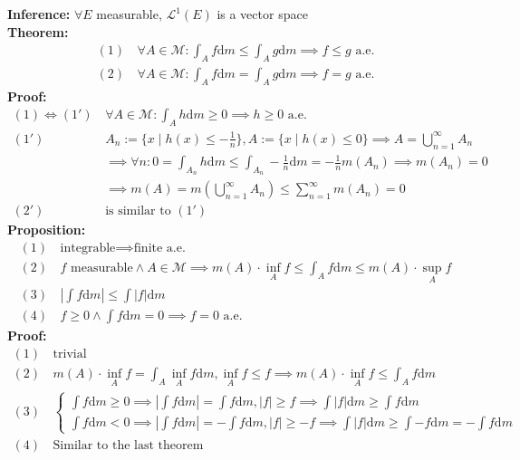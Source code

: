 \documentclass{article}
\newcommand{\sumninf}{\sum\limits_{n=1}^\infty}
\newcommand{\cupninf}{\bigcup\limits_{n=1}^\infty}
\newcommand{\0}{{\bf{0}}}
\newcommand{\1}{{\bf{1}}}
\newcommand{\alev}{\mbox{ a.e.}}
\newcommand{\dint}{\displaystyle\int}
\newcommand{\dif}{\mbox{d}}
\begin{document}
\textbf{Inference:} $\forall E$ measurable, $\mathcal{L}^1(E)$ is a vector space\\
\textbf{Theorem:}
\begin{equation}
\begin{split}
    (1)\,&\forall A\in\mathcal{M}:\int_Af\dif m\le\int_Ag\dif m\implies f\le g\alev\\
    (2)\,&\forall A\in\mathcal{M}:\int_Af\dif m=\int_Ag\dif m\implies f=g\alev
\end{split}
\end{equation}
\textbf{Proof:}
\begin{equation}
\begin{split}
    (1)\iff(1')\,&\forall A\in\mathcal{M}:\int_Ah\dif m\geq0\implies h\geq0\alev\\
    (1')\,&A_n:=\{x\mid h(x)\le-\frac{1}{n}\},A:=\{x\mid h(x)\le 0\}\implies A=\cupninf A_n\\
    &\implies\forall n:0=\int_{A_n}h\dif m\le\int_{A_n}-\frac{1}{n}\dif m=-\frac{1}{n}m(A_n)\implies m(A_n)=0\\
    &\implies m(A)=m(\cupninf A_n)\le\sumninf m(A_n)=0\\
    (2')\,&\mbox{is similar to }(1')
\end{split}
\end{equation}
\textbf{Proposition:}
\begin{equation}
\begin{split}
    (1)\,&\mbox{integrable}\implies\mbox{finite}\alev\\
    (2)\,&f\mbox{ measurable}\land A\in\mathcal{M}\implies m(A)\cdot\inf_Af\le\int_Af\dif m\le m(A)\cdot\sup_Af\\
    (3)\,&\left|\int f\dif m\right|\le\int|f|\dif m\\
    (4)\,&f\geq0\land\int f\dif m=0\implies f=0\alev
\end{split}
\end{equation}
\textbf{Proof:}
\begin{equation}
\begin{split}
    (1)\,&\mbox{trivial}\\
    (2)\,&m(A)\cdot\inf_Af=\int_A\inf_Af\dif m,\inf_Af\le f\implies m(A)\cdot\inf_Af\le\int_Af\dif m\\
    (3)\,&\begin{cases}
        \dint f\dif m\geq0\implies|\dint f\dif m|=\dint f\dif m,|f|\geq f\implies\dint|f|\dif m\geq\dint f\dif m\\
        \dint f\dif m<0\implies|\dint f\dif m|=-\dint f\dif m,|f|\geq -f\implies\dint|f|\dif m\geq\dint-f\dif m=-\dint f\dif m
    \end{cases}\\
    (4)\,&\mbox{Similar to the last theorem}
\end{split}
\end{equation}
\end{document}
